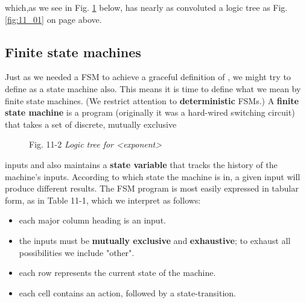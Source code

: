 which,as we see in Fig. \ref{fig:11_02} below, has nearly as convoluted a logic tree as Fig. \ref{fig:11_01} on page \pageref{fig:11_01} above.

\subsection{Finite state machines}\label{chap:11_02_02}

Just as we needed a FSM to achieve a graceful definition of , we might try to define  as a state machine also. This means it is time to define what we mean by finite state machines. (We restrict attention to \textbf{deterministic} FSMs.) A \textbf{finite state machine} is a program (originally it was a hard-wired switching circuit) that takes a set of discrete, mutually exclusive

\begin{figure}
    \caption{ Fig. 11-2 \textit{Logic tree for <exponent>}}
    \label{fig:11_02}
\end{figure}

inputs and also maintains a \textbf{state variable} that tracks the history of the machine's inputs. According to which state the machine is in, a given input will produce different results. The FSM program is most easily expressed in tabular form, as in Table 11-1, which we interpret as follows:

\begin{itemize}
    \item each major column heading is an input.
    \item the inputs must be \textbf{mutually exclusive} and \textbf{exhaustive}; to exhaust all possibilities we include "other".
    \item each row represents the current state of the machine.
    \item each cell contains an action, followed by a state-transition.
\end{itemize}


